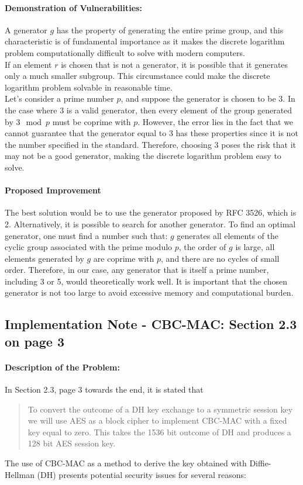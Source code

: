 \documentclass[12pt]{article}
\begin{document}
    \paragraph{Demonstration of Vulnerabilities:}
    A generator $g$ has the property of generating the entire prime group, and this characteristic is of fundamental importance as it makes the discrete logarithm problem computationally difficult to solve with modern computers.
    \\
    If an element $r$ is chosen that is not a generator, it is possible that it generates only a much smaller subgroup. This circumstance could make the discrete logarithm problem solvable in reasonable time.
    \\
    Let's consider a prime number $p$, and suppose the generator is chosen to be $3$. In the case where $3$ is a valid generator, then every element of the group generated by $3 \mod p$ must be coprime with $p$. However, the error lies in the fact that we cannot guarantee that the generator equal to 3 has these properties since it is not the number specified in the standard. Therefore, choosing 3 poses the risk that it may not be a good generator, making the discrete logarithm problem easy to solve.

    \paragraph{Proposed Improvement}
    The best solution would be to use the generator proposed by RFC 3526, which is 2.
    Alternatively, it is possible to search for another generator. To find an optimal generator, one must find a number such that: $g$ generates all elements of the cyclic group associated with the prime modulo $p$, the order of $g$ is large, all elements generated by $g$ are coprime with $p$, and there are no cycles of small order.
    Therefore, in our case, any generator that is itself a prime number, including 3 or 5, would theoretically work well. It is important that the chosen generator is not too large to avoid excessive memory and computational burden.

\subsection{Implementation Note - CBC-MAC: Section 2.3 on page 3}
    \paragraph{Description of the Problem:} In Section 2.3, page 3 towards the end, it is stated that
    \begin{quote}
        To convert the outcome of a DH key exchange to a symmetric session key we will use
        AES as a block cipher to implement CBC-MAC with a fixed key equal to zero. This takes
        the 1536 bit outcome of DH and produces a 128 bit AES session key.
    \end{quote}
    The use of CBC-MAC as a method to derive the key obtained with Diffie-Hellman (DH) presents potential security issues for several reasons:
\end{document}
